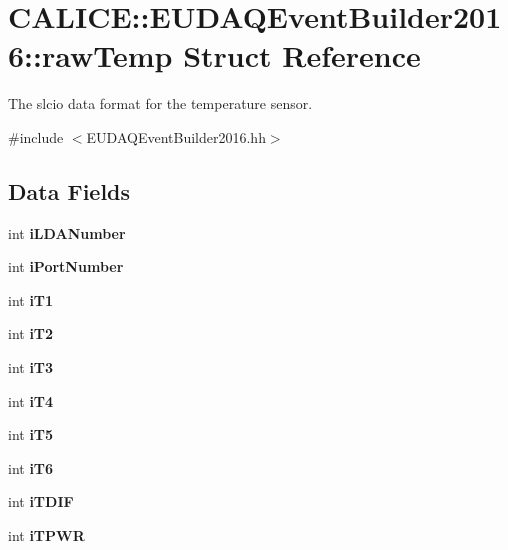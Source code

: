 \section{C\-A\-L\-I\-C\-E\-:\-:E\-U\-D\-A\-Q\-Event\-Builder2016\-:\-:raw\-Temp Struct Reference}
\label{structCALICE_1_1EUDAQEventBuilder2016_1_1rawTemp}


The slcio data format for the temperature sensor.  




{\ttfamily \#include $<$E\-U\-D\-A\-Q\-Event\-Builder2016.\-hh$>$}

\subsection*{Data Fields}
\begin{DoxyCompactItemize}
\item 
int {\bfseries i\-L\-D\-A\-Number}\label{structCALICE_1_1EUDAQEventBuilder2016_1_1rawTemp_a8460e838e665925e751ac255c744bc0a}

\item 
int {\bfseries i\-Port\-Number}\label{structCALICE_1_1EUDAQEventBuilder2016_1_1rawTemp_a893a863598b195242568606ebe69b543}

\item 
int {\bfseries i\-T1}\label{structCALICE_1_1EUDAQEventBuilder2016_1_1rawTemp_aa7a72a5bbf4f992a5558d6368c96f731}

\item 
int {\bfseries i\-T2}\label{structCALICE_1_1EUDAQEventBuilder2016_1_1rawTemp_a22341d30c99d5d97e8046bde0d5458cb}

\item 
int {\bfseries i\-T3}\label{structCALICE_1_1EUDAQEventBuilder2016_1_1rawTemp_a102d2b209d984708ebee772ba24de15f}

\item 
int {\bfseries i\-T4}\label{structCALICE_1_1EUDAQEventBuilder2016_1_1rawTemp_aa442935cfa5afd05e0f9492cb9adf4e3}

\item 
int {\bfseries i\-T5}\label{structCALICE_1_1EUDAQEventBuilder2016_1_1rawTemp_af7bd06eb8a0bfa231b5d08ac1643c2c0}

\item 
int {\bfseries i\-T6}\label{structCALICE_1_1EUDAQEventBuilder2016_1_1rawTemp_a4e4209cbdda7e021e924a11ddea24720}

\item 
int {\bfseries i\-T\-D\-I\-F}\label{structCALICE_1_1EUDAQEventBuilder2016_1_1rawTemp_ac9a9a22adb2b263f941c122ee84c77f5}

\item 
int {\bfseries i\-T\-P\-W\-R}\label{structCALICE_1_1EUDAQEventBuilder2016_1_1rawTemp_a57d652e2a7bdbcb88819aa7a2aa7c04c}

\end{DoxyCompactItemize}


